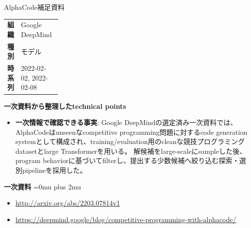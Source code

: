 \begin{technicalnote}{AlphaCode}{補足資料}
\begingroup
\begin{tabularx}{\linewidth}{@{}>{\bfseries}p{0.22\linewidth}X@{}}
組織 & Google DeepMind \\
種別 & モデル \\
時系列 & 2022-02-02, 2022-02-08 \\
\end{tabularx}
\smallskip
{\bfseries 一次資料から整理したtechnical points}
\begin{itemize}[leftmargin=1.5em,itemsep=0.35em]
\item \textbf{一次情報で確認できる事実}: Google DeepMindの選定済み一次資料では、AlphaCodeはunseenなcompetitive programming問題に対するcode generation systemとして構成され、training/evaluation用のcleanな競技プログラミングdatasetとlarge Transformerを用いる。 解候補をlarge-scaleにsampleした後、program behaviorに基づいてfilterし、提出する少数候補へ絞り込む探索・選別pipelineを採用した。
\end{itemize}
\begin{minipage}{\linewidth}
\begin{samepage}
{\bfseries 一次資料}
\begingroup\sloppy
\Urlmuskip=0mu plus 2mu\relax
\begin{itemize}[leftmargin=1.5em,itemsep=0.25em]
\item {\scriptsize\url{http://arxiv.org/abs/2203.07814v1}}
\item {\scriptsize\url{https://deepmind.google/blog/competitive-programming-with-alphacode/}}
\end{itemize}
\endgroup
\end{samepage}
\end{minipage}
\endgroup
\end{technicalnote}
\medskip

